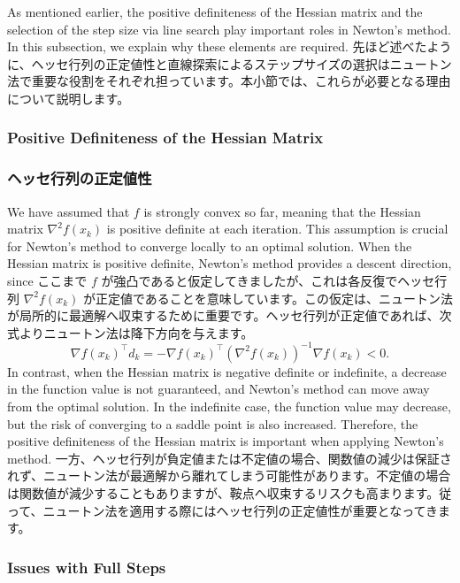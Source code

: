\documentclass[0_main]{subfiles}
\begin{document}
\ifEn
    As mentioned earlier, the positive definiteness of the Hessian matrix and the selection of the step size via line search play important roles in Newton's method. In this subsection, we explain why these elements are required.
\else
    先ほど述べたように、ヘッセ行列の正定値性と直線探索によるステップサイズの選択はニュートン法で重要な役割をそれぞれ担っています。本小節では、これらが必要となる理由について説明します。
\fi

\ifEn
    \subsubsection{Positive Definiteness of the Hessian Matrix}
\else
    \subsubsection{ヘッセ行列の正定値性}
\fi

\ifEn
    We have assumed that $f$ is strongly convex so far, meaning that the Hessian matrix $\nabla^2 f(x_k)$ is positive definite at each iteration. This assumption is crucial for Newton's method to converge locally to an optimal solution. When the Hessian matrix is positive definite, Newton's method provides a descent direction, since
\else
    ここまで $f$ が強凸であると仮定してきましたが、これは各反復でヘッセ行列 $\nabla^2 f(x_k)$ が正定値であることを意味しています。この仮定は、ニュートン法が局所的に最適解へ収束するために重要です。ヘッセ行列が正定値であれば、次式よりニュートン法は降下方向を与えます。
\fi
\begin{equation*}
    \nabla f(x_k)^\top d_k
    = -\nabla f(x_k)^\top \left(\nabla^2 f(x_k)\right)^{-1} \nabla f(x_k)
    < 0.
\end{equation*}
\ifEn
    In contrast, when the Hessian matrix is negative definite or indefinite, a decrease in the function value is not guaranteed, and Newton's method can move away from the optimal solution. In the indefinite case, the function value may decrease, but the risk of converging to a saddle point is also increased. Therefore, the positive definiteness of the Hessian matrix is important when applying Newton's method.
\else
    一方、ヘッセ行列が負定値または不定値の場合、関数値の減少は保証されず、ニュートン法が最適解から離れてしまう可能性があります。不定値の場合は関数値が減少することもありますが、鞍点へ収束するリスクも高まります。従って、ニュートン法を適用する際にはヘッセ行列の正定値性が重要となってきます。
\fi

\ifEn
    \subsubsection{Issues with Full Steps}
\else
\end{document}

